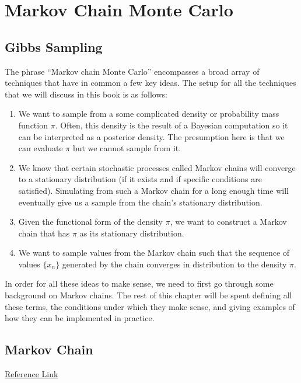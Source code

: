 \chapter{Markov Chain Monte Carlo}
\section{Gibbs Sampling}

The phrase ``Markov chain Monte Carlo'' encompasses a broad array of techniques that have in common a few key ideas. The setup for all the techniques that we will discuss in this book is as follows:

\begin{enumerate}
	\item We want to sample from a some complicated density or probability mass function $\pi$. Often, this density is the result of a Bayesian computation so it can be interpreted as a posterior density. The presumption here is that we can evaluate $\pi$ but we cannot sample from it.
	\item We know that certain stochastic processes called Markov chains will converge to a stationary distribution (if it exists and if specific conditions are satisfied). Simulating from such a Markov chain for a long enough time will eventually give us a sample from the chain’s stationary distribution.
	\item Given the functional form of the density $\pi$, we want to construct a Markov chain that has $\pi$ as its stationary distribution.
	\item We want to sample values from the Markov chain such that the sequence of values $\{x_n\}$ generated by the chain converges in distribution to the density $\pi$.
\end{enumerate}

In order for all these ideas to make sense, we need to first go through some background on Markov chains. The rest of this chapter will be spent defining all these terms, the conditions under which they make sense, and giving examples of how they can be implemented in practice.

\section{Markov Chain}
\href{https://gregorygundersen.com/blog/2019/10/28/ergodic-markov-chains/}{Reference Link}

